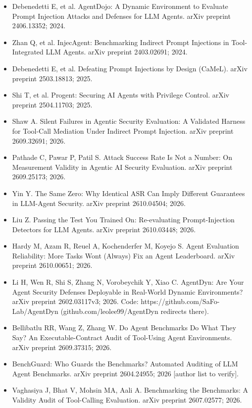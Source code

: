 \documentclass[11pt]{article}
\providecommand{\tightlist}{\setlength{\itemsep}{0pt}\setlength{\parskip}{0pt}}
\begin{document}
\begin{itemize}
\tightlist
\item
  Debenedetti E, et al. AgentDojo: A Dynamic Environment to Evaluate Prompt Injection Attacks and Defenses for LLM Agents. arXiv preprint 2406.13352; 2024.
\item
  Zhan Q, et al. InjecAgent: Benchmarking Indirect Prompt Injections in Tool-Integrated LLM Agents. arXiv preprint 2403.02691; 2024.
\item
  Debenedetti E, et al. Defeating Prompt Injections by Design (CaMeL). arXiv preprint 2503.18813; 2025.
\item
  Shi T, et al. Progent: Securing AI Agents with Privilege Control. arXiv preprint 2504.11703; 2025.
\item
  Shaw A. Silent Failures in Agentic Security Evaluation: A Validated Harness for Tool-Call Mediation Under Indirect Prompt Injection. arXiv preprint 2609.32691; 2026.
\item
  Pathade C, Pawar P, Patil S. Attack Success Rate Is Not a Number: On Measurement Validity in Agentic AI Security Evaluation. arXiv preprint 2609.25173; 2026.
\item
  Yin Y. The Same Zero: Why Identical ASR Can Imply Different Guarantees in LLM-Agent Security. arXiv preprint 2610.04504; 2026.
\item
  Liu Z. Passing the Test You Trained On: Re-evaluating Prompt-Injection Detectors for LLM Agents. arXiv preprint 2610.03448; 2026.
\item
  Hardy M, Azam R, Reuel A, Kochenderfer M, Koyejo S. Agent Evaluation Reliability: More Tasks Won\textquotesingle t (Always) Fix an Agent Leaderboard. arXiv preprint 2610.00651; 2026.
\item
  Li H, Wen R, Shi S, Zhang N, Vorobeychik Y, Xiao C. AgentDyn: Are Your Agent Security Defenses Deployable in Real-World Dynamic Environments? arXiv preprint 2602.03117v3; 2026. Code: https://github.com/SaFo-Lab/AgentDyn (github.com/leolee99/AgentDyn redirects there).
\item
  Bellibatlu RR, Wang Z, Zhang W. Do Agent Benchmarks Do What They Say? An Executable-Contract Audit of Tool-Using Agent Environments. arXiv preprint 2609.37315; 2026.
\item
  BenchGuard: Who Guards the Benchmarks? Automated Auditing of LLM Agent Benchmarks. arXiv preprint 2604.24955; 2026 {[}author list to verify{]}.
\item
  Vaghasiya J, Bhat V, Mohsin MA, Aali A. Benchmarking the Benchmarks: A Validity Audit of Tool-Calling Evaluation. arXiv preprint 2607.02577; 2026.

\end{itemize}
\end{document}
